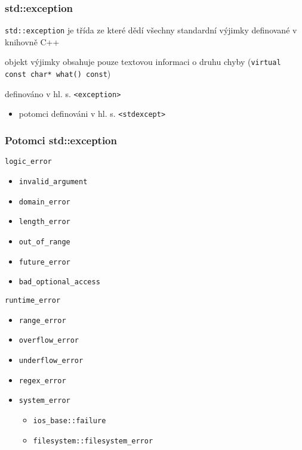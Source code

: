 \begin{frame}[fragile]
\frametitle{std::exception}
\begin{bitemize}
\item \lstinline|std::exception| je třída ze které dědí všechny standardní výjimky definované v knihovně C++
\item objekt výjimky obsahuje pouze textovou informaci o druhu chyby (\lstinline|virtual const char* what() const|)
\item definováno v hl. s. \lstinline|<exception>|
\begin{itemize}
\item potomci definováni v hl. s. \lstinline|<stdexcept>|
\end{itemize}
\end{bitemize}
\end{frame}



\begin{frame}[fragile]
\frametitle{Potomci std::exception}

\begin{bitemize}
\item \lstinline|logic_error|
\begin{itemize}
\item \lstinline|invalid_argument|
\item \lstinline|domain_error|
\item \lstinline|length_error|
\item \lstinline|out_of_range|
\item \lstinline|future_error|
\item \lstinline|bad_optional_access|
\end{itemize}

\item \lstinline|runtime_error|
\begin{itemize}
\item \lstinline|range_error|
\item \lstinline|overflow_error|
\item \lstinline|underflow_error|
\item \lstinline|regex_error|
\item \lstinline|system_error|
\begin{itemize}
\item \lstinline|ios_base::failure|
\item \lstinline|filesystem::filesystem_error|
\end{itemize}
\end{itemize}
\end{bitemize}
\end{frame}



